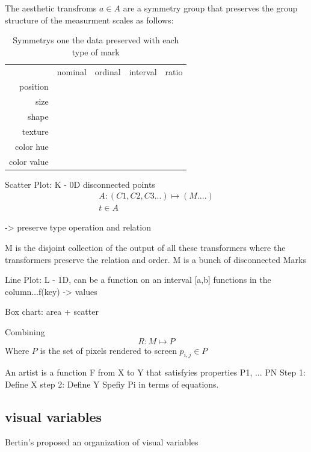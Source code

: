 \documentclass[letterpaper,onecolumn,titlepage]{Ythesis}
\begin{document}
The aesthetic transfroms $a \in A$ are a symmetry group that preserves the group structure of the measurment scales as follows: 


\begin{table}
    \label{tab:sym_mark}
    \begin{tabular}{|r|r|r|r|r|}
             & nominal & ordinal & interval & ratio \\
    position &         &         &          &       \\
    size     & &         &          &       \\
    shape    &&         &          &       \\
    texture  &&         &          &       \\
    color hue &&         &          &       \\
    color value &&         &          &       \\
    \end{tabular}
\caption{Symmetrys one the data preserved with each type of mark\cite{bertinIIPropertiesGraphic2011,munznerMarksChannels}}
\end{table}

Scatter Plot:
K - 0D disconnected points
\begin{multline}
A: (C1, C2, C3...)\mapsto (M....)\\
t \in A 
\end{multline}

-> preserve type operation and relation

M is the disjoint collection of the output of all these transformers where the transformers preserve the relation and order. M is a bunch of disconnected Marks

Line Plot:
L - 1D, can be a function on an interval [a,b]
functions in the column...f(key) -> values

Box chart: area + scatter 


Combining 
\begin{equation}
    \label{eg:renderer}
    R: M \mapsto P
\end{equation}
Where $P$ is the set of pixels rendered to screen ${p_{i,j} \in P}$


An artist is a function F from X to Y
that satisfyies properties P1, ... PN
Step 1: Define X
step 2: Define Y
Spefiy Pi in terms of equations.


\subsection{visual variables}
Bertin's proposed an organization of visual variables \cite{bertinIIPropertiesGraphic2011} 
\end{document}
